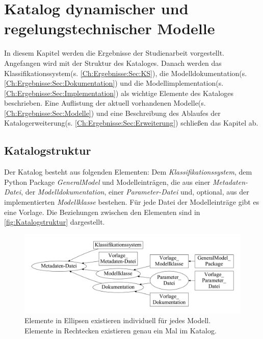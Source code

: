 \chapter{Katalog dynamischer und regelungstechnischer Modelle}
\label{Ch:Ergebnisse}
In diesem Kapitel werden die Ergebnisse der Studienarbeit vorgestellt. Angefangen wird mit der Struktur des Kataloges. Danach werden das Klassifikationssystem(s. \ref{Ch:Ergebnisse:Sec:KS}), die Modelldokumentation(s. \ref{Ch:Ergebnisse:Sec:Dokumentation}) und die Modellimplementation(s. \ref{Ch:Ergebnisse:Sec:Implementation}) als wichtige Elemente des Kataloges beschrieben. Eine Auflistung der aktuell vorhandenen Modelle(s. \ref{Ch:Ergebnisse:Sec:Modelle}) und eine Beschreibung des Ablaufes der Katalogerweiterung(s. \ref{Ch:Ergebnisse:Sec:Erweiterung}) schließen das Kapitel ab.
\section{Katalogstruktur}
\label{Ch:Ergebnisse:Sec:Struktur}
Der Katalog besteht aus folgenden Elementen: Dem \textit{Klassifikationssystem}, dem Python Package \textit{GeneralModel} und Modelleinträgen, die aus einer \textit{Metadaten-Datei}, der \textit{Modelldokumentation}, einer \textit{Parameter-Datei} und, optional, aus der implementierten \textit{Modellklasse} bestehen. Für jede Datei der Modelleinträge gibt es eine Vorlage. Die Beziehungen zwischen den Elementen sind in \autoref{fig:Katalogstruktur} dargestellt.

\begin{figure}[H]
	\centering
	\includegraphics[width=1\linewidth]{Katalogstruktur}
	\caption[Katalogstruktur]{Elemente in Ellipsen existieren individuell für jedes Modell. Elemente in Rechtecken existieren genau ein Mal im Katalog.}
	\label{fig:Katalogstruktur}
\end{figure}

